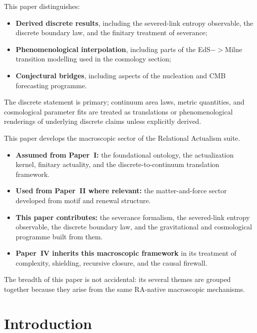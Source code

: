 \documentclass[11pt]{article}
\def\to{->}%
\begin{document}
\begin{tcolorbox}[title=Epistemic Status of Results in This Paper,colback=gray!5,colframe=gray!60]
This paper distinguishes:
\begin{itemize}[nosep]
    \item \textbf{Derived discrete results}, including the severed-link entropy observable, the discrete boundary law, and the finitary treatment of severance;
    \item \textbf{Phenomenological interpolation}, including parts of the EdS$\to$Milne transition modelling used in the cosmology section;
    \item \textbf{Conjectural bridges}, including aspects of the nucleation and CMB forecasting programme.
\end{itemize}
The discrete statement is primary; continuum area laws, metric quantities, and cosmological parameter fits are treated as translations or phenomenological renderings of underlying discrete claims unless explicitly derived.
\end{tcolorbox}

\begin{tcolorbox}[title=Place of This Paper in the RA Suite,colback=gray!5,colframe=gray!60]
This paper develops the macroscopic sector of the Relational Actualism suite.
\begin{itemize}[nosep]
    \item \textbf{Assumed from Paper~I:} the foundational ontology, the actualization kernel, finitary actuality, and the discrete-to-continuum translation framework.
    \item \textbf{Used from Paper~II where relevant:} the matter-and-force sector developed from motif and renewal structure.
    \item \textbf{This paper contributes:} the severance formalism, the severed-link entropy observable, the discrete boundary law, and the gravitational and cosmological programme built from them.
    \item \textbf{Paper~IV inherits this macroscopic framework} in its treatment of complexity, shielding, recursive closure, and the causal firewall.
\end{itemize}
The breadth of this paper is not accidental: its several themes are grouped together because they arise from the same RA-native macroscopic mechanisms.
\end{tcolorbox}

\section{Introduction}
\end{document}

